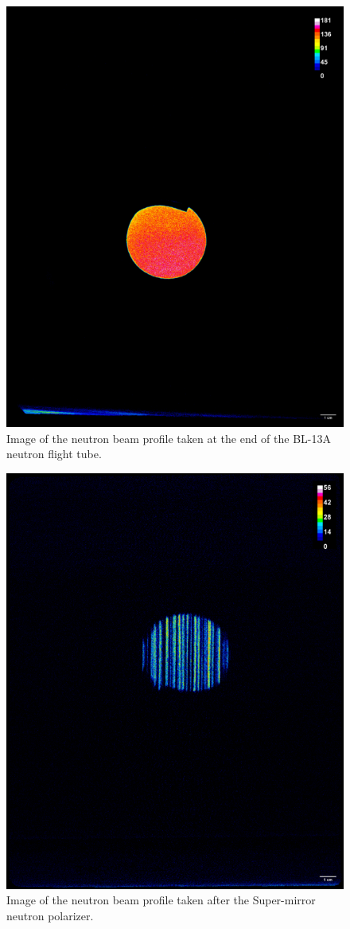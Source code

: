 \begin{figure}[h!]
\centering
\includegraphics[width=\textwidth]{figures/appendix-figs/beforepol_beamimage.png}
\caption{Image of the neutron beam profile taken at the end of the BL-13A neutron flight tube.}
\label{fig:beam_image}
\end{figure}

\begin{figure}[h!]
\centering
\includegraphics[width=\textwidth]{figures/appendix-figs/afterpol_beamimage.png}
\caption{Image of the neutron beam profile taken after the Super-mirror neutron polarizer.}
\label{fig:beam_image}
\end{figure}
